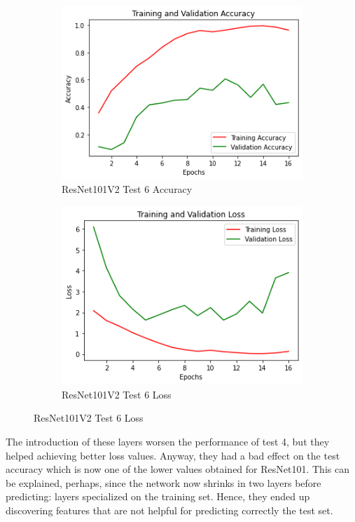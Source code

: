 \begin{figure}[H]
	\begin{subfigure}{0.5\textwidth}
		\includegraphics[width=0.9\linewidth]{img/resnet101v2/resnet101ft4denseacc.png} 
		\caption{ResNet101V2 Test 6 Accuracy}
		\label{fig:resnet101ft4denseacc}
	\end{subfigure}
	\begin{subfigure}{0.5\textwidth}
		\includegraphics[width=0.9\linewidth]{img/resnet101v2/resnet101ft4denseloss.png}
		\caption{ResNet101V2 Test 6 Loss}
		\label{fig:resnet101ft4denseloss}
	\end{subfigure}
\end{figure}

The introduction of these layers worsen the performance of test 4, but they helped achieving better loss values. Anyway, they had a bad effect on the test accuracy which is now one of the lower values obtained for ResNet101. This can be explained, perhaps, since the network now shrinks in two layers before predicting: layers specialized on the training set. Hence, they ended up discovering features that are not helpful for predicting correctly the test set.



